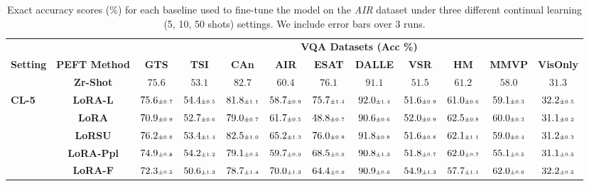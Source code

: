 \begin{table}
\caption{Exact accuracy scores (\%) for each baseline used to fine-tune the model on the \emph{AIR} dataset under three different continual learning (5, 10, 50 shots)  settings. We include error bars over 3 runs.}
 \label{table:fine_tune_llm_aircraft}
 \vskip 0.15in
\begin{center}
\begin{small}
\begingroup
\setlength{\tabcolsep}{3.6pt}
\begin{tabular}{l c c c c c c c c c c c}
\toprule
 & & \multicolumn{10}{c}{\textbf{VQA Datasets (Acc \%)}}  \\
\cmidrule(lr){3-12}
\textbf{Setting} & \textbf{PEFT Method}  & \textbf{GTS} & \textbf{TSI} & \textbf{CAn} & \textbf{AIR} & \textbf{ESAT} & \textbf{DALLE} & \textbf{VSR} & \textbf{HM} & \textbf{MMVP} & \textbf{VisOnly} \\
\midrule
 & \textbf{Zr-Shot} & $75.6$ & $53.1$ & $82.7$ & $60.4$ & $76.1$ & $91.1$ & $51.5$ & $61.2$ & $58.0$ & $31.3$ \\
\midrule
\multirow{6}{*}{\textbf{CL-5}} & \textbf{LoRA-L} & $75.6 \mbox{\tiny\ensuremath{\pm 0.7}}$ & $54.4 \mbox{\tiny\ensuremath{\pm 0.5}}$ & $81.8 \mbox{\tiny\ensuremath{\pm 1.1}}$ & $58.7 \mbox{\tiny\ensuremath{\pm 0.9}}$ & $75.7 \mbox{\tiny\ensuremath{\pm 1.4}}$ & $92.0 \mbox{\tiny\ensuremath{\pm 1.4}}$ & $51.6 \mbox{\tiny\ensuremath{\pm 0.9}}$ & $61.0 \mbox{\tiny\ensuremath{\pm 0.6}}$ & $59.1 \mbox{\tiny\ensuremath{\pm 0.3}}$ & $32.2 \mbox{\tiny\ensuremath{\pm 0.5}}$ \\
& \textbf{LoRA} & $70.9 \mbox{\tiny\ensuremath{\pm 0.9}}$ & $52.7 \mbox{\tiny\ensuremath{\pm 0.6}}$ & $79.0 \mbox{\tiny\ensuremath{\pm 0.7}}$ & $61.7 \mbox{\tiny\ensuremath{\pm 0.5}}$ & $48.8 \mbox{\tiny\ensuremath{\pm 0.7}}$ & $90.6 \mbox{\tiny\ensuremath{\pm 0.6}}$ & $52.0 \mbox{\tiny\ensuremath{\pm 0.9}}$ & $62.5 \mbox{\tiny\ensuremath{\pm 0.8}}$ & $60.0 \mbox{\tiny\ensuremath{\pm 0.3}}$ & $31.1 \mbox{\tiny\ensuremath{\pm 0.2}}$ \\
& \textbf{LoRSU} & $76.2 \mbox{\tiny\ensuremath{\pm 0.8}}$ & $53.4 \mbox{\tiny\ensuremath{\pm 1.4}}$ & $82.5 \mbox{\tiny\ensuremath{\pm 1.0}}$ & $65.2 \mbox{\tiny\ensuremath{\pm 1.3}}$ & $76.0 \mbox{\tiny\ensuremath{\pm 0.9}}$ & $91.8 \mbox{\tiny\ensuremath{\pm 0.8}}$ & $51.6 \mbox{\tiny\ensuremath{\pm 0.8}}$ & $62.1 \mbox{\tiny\ensuremath{\pm 1.1}}$ & $59.0 \mbox{\tiny\ensuremath{\pm 0.4}}$ & $31.2 \mbox{\tiny\ensuremath{\pm 0.3}}$ \\
& \textbf{LoRA-Ppl} & $74.9 \mbox{\tiny\ensuremath{\pm 0.8}}$ & $54.2 \mbox{\tiny\ensuremath{\pm 1.2}}$ & $79.1 \mbox{\tiny\ensuremath{\pm 0.5}}$ & $59.7 \mbox{\tiny\ensuremath{\pm 0.9}}$ & $68.5 \mbox{\tiny\ensuremath{\pm 0.9}}$ & $90.8 \mbox{\tiny\ensuremath{\pm 1.3}}$ & $51.8 \mbox{\tiny\ensuremath{\pm 0.7}}$ & $62.0 \mbox{\tiny\ensuremath{\pm 0.7}}$ & $55.1 \mbox{\tiny\ensuremath{\pm 0.5}}$ & $31.1 \mbox{\tiny\ensuremath{\pm 0.5}}$ \\
& \textbf{LoRA-F} & $72.3 \mbox{\tiny\ensuremath{\pm 0.5}}$ & $50.6 \mbox{\tiny\ensuremath{\pm 1.3}}$ & $78.7 \mbox{\tiny\ensuremath{\pm 1.4}}$ & $70.0 \mbox{\tiny\ensuremath{\pm 1.3}}$ & $64.4 \mbox{\tiny\ensuremath{\pm 0.9}}$ & $90.9 \mbox{\tiny\ensuremath{\pm 0.6}}$ & $54.9 \mbox{\tiny\ensuremath{\pm 1.3}}$ & $57.7 \mbox{\tiny\ensuremath{\pm 1.1}}$ & $62.0 \mbox{\tiny\ensuremath{\pm 0.6}}$ & $32.2 \mbox{\tiny\ensuremath{\pm 0.5}}$ \\

\end{tabular}
\end{small}
\end{center}
\end{table}

